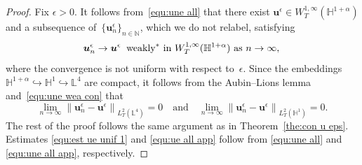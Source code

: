 \documentclass[11pt,reqno]{amsart}
\theoremstyle{definition}
\numberwithin{equation}{section}
\newcommand{\bff}{\boldsymbol}
\newcommand{\bb}{\mathbb}
\newcommand{\norm}[2]{\left\|{#1}\right\|_{#2}}
\begin{document}
\begin{proof}
	Fix $ \epsilon > 0$.
	It follows from~\eqref{equ:une all} that there exist
	$\bff{u}^{\epsilon}\in W^{1,\infty}_{T}(\bb{H}^{1+\alpha})$ and a subsequence
	of~$\{\bff{u}_n^\epsilon\}_{n\in\bb{N}}$,
	which we do not relabel, satisfying
	\begin{equation}\label{equ:une wea con}
		\bff{u}^\epsilon_n\to\bff{u}^\epsilon
		\;\;\text{weakly}^\ast \text{ in $W^{1,\infty}_{T}(\bb{H}^{1+\alpha})$ as $n\to \infty$},
			\\
	\end{equation}
	where the convergence is not uniform with respect to~$ \epsilon$.
	Since the embeddings $\bb{H}^{1+\alpha}\hookrightarrow \bb{H}^1 \hookrightarrow \bb{L}^4$ are compact, it follows from the
	Aubin--Lions lemma and~\eqref{equ:une wea con} that 
	\begin{equation*}
		\lim_{n\to\infty} \norm{\bff{u}_n^\epsilon-\bff{u}^\epsilon}{L^2_T(\bb{L}^4)} 
		= 0
		\quad\text{and}\quad 
		\lim_{n\to\infty} \norm{\bff{u}_n^\epsilon-\bff{u}^\epsilon}{L^2_T(\bb{H}^1)} 
		= 0.
	\end{equation*}
	The rest of the proof follows the same argument as in Theorem~\ref{the:con u eps}. Estimates \eqref{equ:est ue unif 1} and \eqref{equ:ue all app} follow from \eqref{equ:une all} and \eqref{equ:une all app}, respectively.
\end{proof}
	
\end{document}
